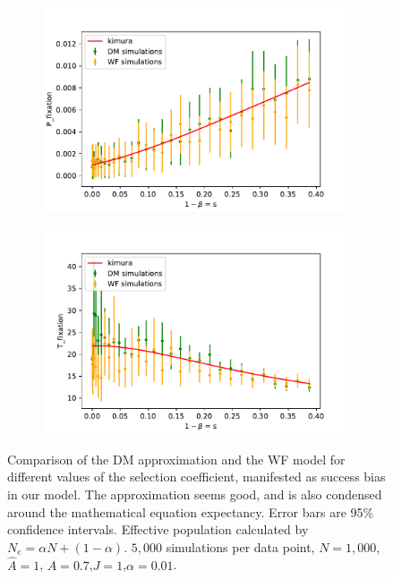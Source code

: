 \documentclass[11pt]{article}
\begin{document}
\begin{figure}[t]
  \begin{center}
  \begin{subfigure}[a]{0.49\linewidth}
  \caption{}
    \includegraphics[width=\linewidth]{../figures/binary/fix_prob_var_beta.pdf}
   \end{subfigure}
   \begin{subfigure}[a]{0.49\linewidth}
    \caption{}
    \includegraphics[width=\linewidth]{../figures/binary/fix_time_var_beta.pdf}
   \end{subfigure}
  \end{center}
  \caption{Comparison of the DM approximation and the WF model for different values of the selection coefficient, manifested as success bias in our model. The approximation seems good, and is also condensed around the mathematical equation expectancy. Error bars are 95\% confidence intervals.
  Effective population calculated by $N_e=\alpha N + (1-\alpha)$.
  $5,000$ simulations per data point, $N=1,000$, $\hat{A}=1$, $A=0.7$,$J=1$,$\alpha=0.01$.}
  \label{fig:var_beta}
\end{figure}
\end{document}
